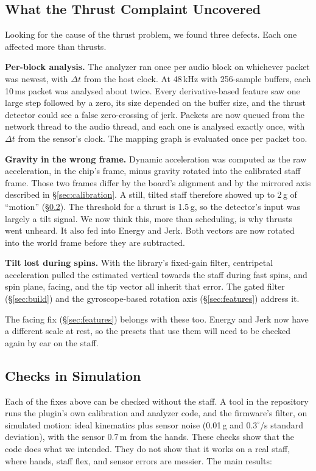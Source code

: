 \documentclass[sigconf,nonacm]{acmart}
\begin{document}
\subsection{What the Thrust Complaint Uncovered}
\label{sec:fixes}
Looking for the cause of the thrust problem, we found three defects. Each one affected more than
thrusts.

\textbf{Per-block analysis.} The analyzer ran once per audio block on whichever packet was newest,
with $\Delta t$ from the host clock. At 48\,kHz with 256-sample buffers, each 10\,ms packet was
analysed about twice. Every derivative-based feature saw one large step followed by a zero, its
size depended on the buffer size, and the thrust detector could see a false zero-crossing of jerk.
Packets are now queued from the network thread to the audio thread, and each one is analysed exactly
once, with $\Delta t$ from the sensor's clock. The mapping graph is evaluated once per packet too.

\textbf{Gravity in the wrong frame.} Dynamic acceleration was computed as the raw acceleration, in
the chip's frame, minus gravity rotated into the calibrated staff frame. Those two frames differ by
the board's alignment and by the mirrored axis described in \S\ref{sec:calibration}. A still,
tilted staff therefore showed up to 2\,g of ``motion'' (\S\ref{sec:sim}). The threshold for a thrust
is 1.5\,g, so the detector's input was largely a tilt signal. We now think this, more than
scheduling, is why thrusts went unheard. It also fed into Energy and Jerk. Both vectors are now
rotated into the world frame before they are subtracted.

\textbf{Tilt lost during spins.} With the library's fixed-gain filter, centripetal acceleration
pulled the estimated vertical towards the staff during fast spins, and spin plane, facing, and the
tip vector all inherit that error. The gated filter (\S\ref{sec:build}) and the gyroscope-based
rotation axis (\S\ref{sec:features}) address it.

The facing fix (\S\ref{sec:features}) belongs with these too. Energy and Jerk now have a different
scale at rest, so the presets that use them will need to be checked again by ear on the staff.

\subsection{Checks in Simulation}
\label{sec:sim}
Each of the fixes above can be checked without the staff. A tool in the repository runs the
plugin's own calibration and analyzer code, and the firmware's filter, on simulated motion: ideal
kinematics plus sensor noise (0.01\,g and $0.3^\circ$/s standard deviation), with the sensor 0.7\,m
from the hands. These checks show that the code does what we intended. They do not show that it
works on a real staff, where hands, staff flex, and sensor errors are messier. The main results:
\end{document}
